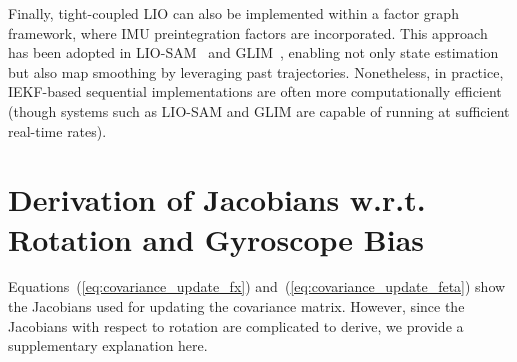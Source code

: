 Finally, tight-coupled LIO can also be implemented within a factor graph framework, where IMU preintegration factors are incorporated.
This approach has been adopted in LIO-SAM~\cite{liosam2020shan} and GLIM~\cite{KoideRAS2024}, enabling not only state estimation but also map smoothing by leveraging past trajectories.
Nonetheless, in practice, IEKF-based sequential implementations are often more computationally efficient (though systems such as LIO-SAM and GLIM are capable of running at sufficient real-time rates).











\section{Derivation of Jacobians w.r.t. Rotation and Gyroscope Bias}
\label{sec:回転および角速度バイアスに関するヤコビアンの導出}

Equations~(\ref{eq:covariance_update_fx}) and~(\ref{eq:covariance_update_feta}) show the Jacobians used for updating the covariance matrix.
However, since the Jacobians with respect to rotation are complicated to derive, we provide a supplementary explanation here.

